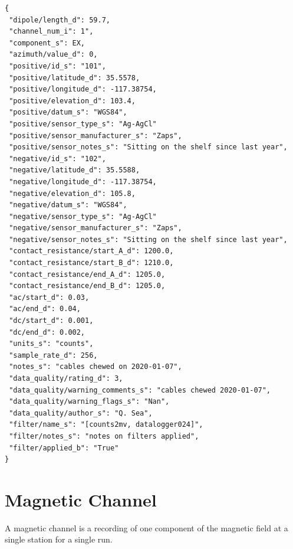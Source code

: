 \documentclass{article}
\begin{document}
\begin{verbatim}
{
 "dipole/length_d": 59.7,
 "channel_num_i": 1",
 "component_s": EX,
 "azimuth/value_d": 0,
 "positive/id_s": "101",
 "positive/latitude_d": 35.5578,
 "positive/longitude_d": -117.38754,
 "positive/elevation_d": 103.4,
 "positive/datum_s": "WGS84",
 "positive/sensor_type_s": "Ag-AgCl"
 "positive/sensor_manufacturer_s": "Zaps",
 "positive/sensor_notes_s": "Sitting on the shelf since last year",
 "negative/id_s": "102",
 "negative/latitude_d": 35.5588,
 "negative/longitude_d": -117.38754,
 "negative/elevation_d": 105.8,
 "negative/datum_s": "WGS84",
 "negative/sensor_type_s": "Ag-AgCl"
 "negative/sensor_manufacturer_s": "Zaps",
 "negative/sensor_notes_s": "Sitting on the shelf since last year",
 "contact_resistance/start_A_d": 1200.0,
 "contact_resistance/start_B_d": 1210.0,
 "contact_resistance/end_A_d": 1205.0,
 "contact_resistance/end_B_d": 1205.0,
 "ac/start_d": 0.03,
 "ac/end_d": 0.04,
 "dc/start_d": 0.001,
 "dc/end_d": 0.002,
 "units_s": "counts",
 "sample_rate_d": 256,
 "notes_s": "cables chewed on 2020-01-07",
 "data_quality/rating_d": 3,
 "data_quality/warning_comments_s": "cables chewed 2020-01-07",
 "data_quality/warning_flags_s": "Nan",
 "data_quality/author_s": "Q. Sea",
 "filter/name_s": "[counts2mv, datalogger024]",
 "filter/notes_s": "notes on filters applied",
 "filter/applied_b": "True"
}
\end{verbatim}

\newpage
\section{Magnetic Channel}

A magnetic channel is a recording of one component of the magnetic field at a single station for a single run.
\end{document}
